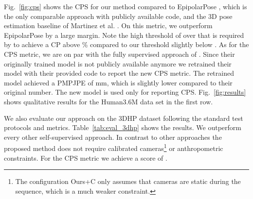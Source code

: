 \documentclass[final]{cvpr}
\begin{document}
Fig.~\ref{fig:cps} shows the CPS for our method compared to EpipolarPose \cite{kocabas2019epipolar}, which is the only comparable approach with publicly available code, and the 3D pose estimation baseline of Martinez et al. \cite{martinez_2017_3Dbaseline}.
On this metric, we outperform EpipolarPose by a large margin.
Note the high threshold of over  that is required by \cite{kocabas2019epipolar} to achieve a CP above \% compared to our threshold slightly below .
As for the CPS metric, we are on par with the fully supervised approach of \cite{martinez_2017_3Dbaseline}.
Since their originally trained model is not publicly available anymore we retrained their model with their provided code to report the new CPS metric. The retrained model achieved a PMPJPE of mm, which is slightly lower compared to their original number. The new model is used only for reporting CPS. 
Fig.~\ref{fig:results} shows qualitative results for the Human3.6M data set in the first row.

We also evaluate our approach on the 3DHP dataset \cite{mpii3Dhp2017} following the standard test protocols and metrics.
Table~\ref{tab:eval_3dhp} shows the results.
We outperform every other self-supervised approach.
In contrast to other approaches the proposed method does not require calibrated cameras\footnote{The configuration Ours+C only assumes that cameras are static during the sequence, which is a much weaker constraint.} or anthropometric constraints.
For the CPS metric we achieve a score of .
\end{document}
